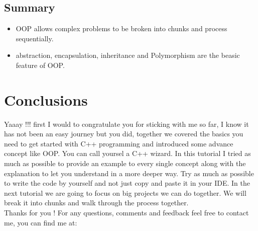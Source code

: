 \documentclass[11pt, a4paper]{article}
\begin{document}
\subsection{Summary}
\begin{itemize}
    \item OOP allows complex problems to be broken into chunks and process sequentially.
    \item abstraction, encapsulation, inheritance and Polymorphism are the beasic feature of OOP.
\end{itemize}

\section{Conclusions}
Yaaay !!! first I would to congratulate you for sticking with me so far,
I know it has not been an easy journey but you did, together we covered the basics
you need to get started with C++ programming and introduced some advance concept like OOP.
You can call yoursel a C++ wizard. In this tutorial I tried as much as possible to provide
an example to every single concept along with the explanation to let you understand in a more
deeper way. Try as much as possible to write the code by yourself and not just copy and paste
it in your IDE. In the next tutorial we are going to focus on big projects we can do together.
We will break it into chunks and walk through the process together.
\\Thanks for you !
For any questions, comments and feedback feel free to contact me, you can find me at: \\
\end{document}
